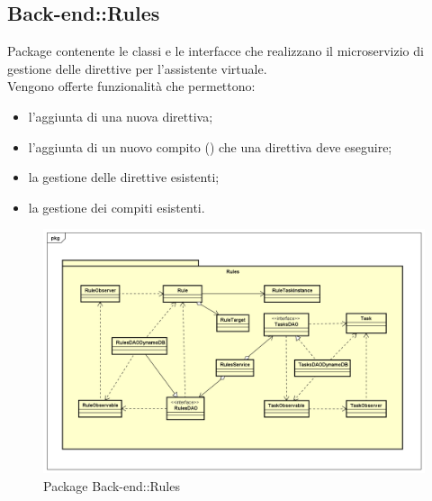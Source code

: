 \subsection{Back-end::Rules}
Package contenente le classi e le interfacce che realizzano il microservizio di gestione delle direttive per l'assistente virtuale.\\ Vengono offerte funzionalità che permettono: \begin{itemize} \item l'aggiunta di una nuova direttiva; \item l'aggiunta di un nuovo compito () che una direttiva deve eseguire; \item la gestione delle direttive esistenti; \item la gestione dei compiti esistenti. \end{itemize}
\begin{figure}[h] \centering \includegraphics[width=\textwidth,height=\textheight,keepaspectratio]{images/diagrams/back-end/Official_Backend_0304/Rules.png}
\caption{Package Back-end::Rules}
\end{figure}
\newpage

